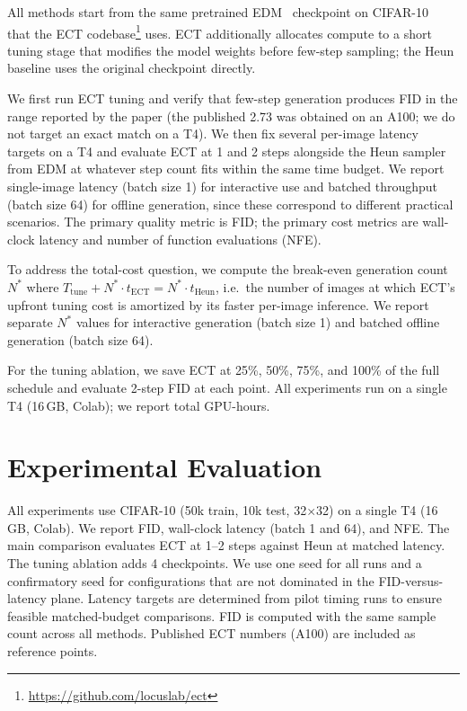 \documentclass{article}
\begin{document}
All methods start from the same pretrained EDM~\cite{karras2022edm} checkpoint on CIFAR-10~\cite{krizhevsky2009cifar} that the ECT codebase\footnote{\url{https://github.com/locuslab/ect}} uses. ECT additionally allocates compute to a short tuning stage that modifies the model weights before few-step sampling; the Heun baseline uses the original checkpoint directly.

We first run ECT tuning and verify that few-step generation produces FID in the range reported by the paper (the published 2.73 was obtained on an A100; we do not target an exact match on a T4). We then fix several per-image latency targets on a T4 and evaluate ECT at 1 and 2 steps alongside the Heun sampler from EDM at whatever step count fits within the same time budget. We report single-image latency (batch size 1) for interactive use and batched throughput (batch size 64) for offline generation, since these correspond to different practical scenarios. The primary quality metric is FID; the primary cost metrics are wall-clock latency and number of function evaluations (NFE).

To address the total-cost question, we compute the break-even generation count $N^*$ where
$T_{\mathrm{tune}} + N^* \cdot t_{\mathrm{ECT}} = N^* \cdot t_{\mathrm{Heun}}$,
i.e.\ the number of images at which ECT's upfront tuning cost is amortized by its faster per-image inference. We report separate $N^*$ values for interactive generation (batch size 1) and batched offline generation (batch size 64).

For the tuning ablation, we save ECT at 25\%, 50\%, 75\%, and 100\% of the full schedule and evaluate 2-step FID at each point. All experiments run on a single T4 (16\,GB, Colab); we report total GPU-hours.

\section{Experimental Evaluation}

All experiments use CIFAR-10 (50k train, 10k test, 32$\times$32) on a single T4 (16\,GB, Colab). We report FID, wall-clock latency (batch 1 and 64), and NFE. The main comparison evaluates ECT at 1--2 steps against Heun at matched latency. The tuning ablation adds 4 checkpoints. We use one seed for all runs and a confirmatory seed for configurations that are not dominated in the FID-versus-latency plane. Latency targets are determined from pilot timing runs to ensure feasible matched-budget comparisons. FID is computed with the same sample count across all methods. Published ECT numbers (A100) are included as reference points.
\end{document}
